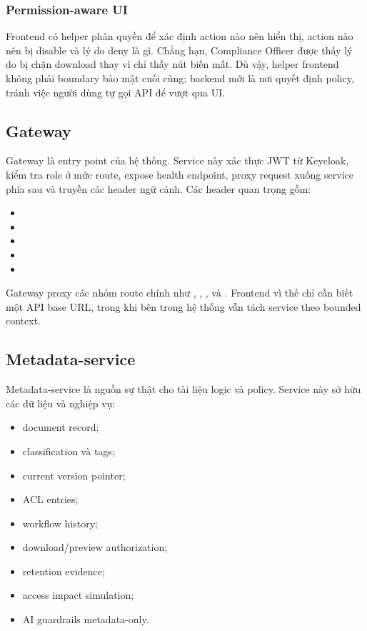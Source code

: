 \subsubsection{Permission-aware UI}

Frontend có helper phân quyền để xác định action nào nên hiển thị, action nào nên bị disable và lý do deny là gì. Chẳng hạn, Compliance Officer được thấy lý do bị chặn download thay vì chỉ thấy nút biến mất. Dù vậy, helper frontend không phải boundary bảo mật cuối cùng; backend mới là nơi quyết định policy, tránh việc người dùng tự gọi API để vượt qua UI.

\subsection{Gateway}

Gateway là entry point của hệ thống. Service này xác thực JWT từ Keycloak, kiểm tra role ở mức route, expose health endpoint, proxy request xuống service phía sau và truyền các header ngữ cảnh. Các header quan trọng gồm:

\begin{itemize}
  \item {}
  \item {}
  \item {}
  \item {}
  \item {}
\end{itemize}

Gateway proxy các nhóm route chính như , , ,  và . Frontend vì thế chỉ cần biết một API base URL, trong khi bên trong hệ thống vẫn tách service theo bounded context.

\subsection{Metadata-service}

Metadata-service là nguồn sự thật cho tài liệu logic và policy. Service này sở hữu các dữ liệu và nghiệp vụ:

\begin{itemize}
  \item document record;
  \item classification và tags;
  \item current version pointer;
  \item ACL entries;
  \item workflow history;
  \item download/preview authorization;
  \item retention evidence;
  \item access impact simulation;
  \item AI guardrails metadata-only.
\end{itemize}

